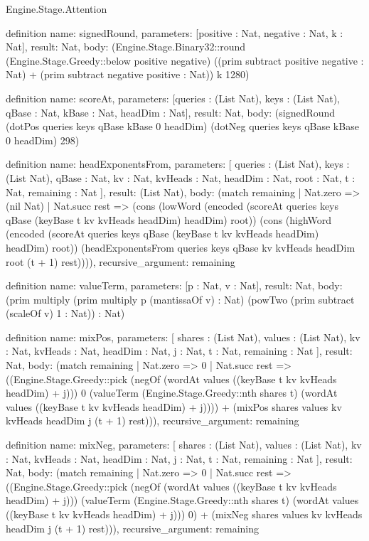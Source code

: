 \begin{lexlean}{Engine.Stage.Attention}
\begin{semanticmodule}
definition{
  name: signedRound,
  parameters: [positive : Nat, negative : Nat, k : Nat],
  result: Nat,
  body: (Engine.Stage.Binary32::round (Engine.Stage.Greedy::below positive negative) ((prim subtract positive negative : Nat) + (prim subtract negative positive : Nat)) k 1280)
}

definition{
  name: scoreAt,
  parameters: [queries : (List Nat), keys : (List Nat), qBase : Nat, kBase : Nat, headDim : Nat],
  result: Nat,
  body: (signedRound (dotPos queries keys qBase kBase 0 headDim) (dotNeg queries keys qBase kBase 0 headDim) 298)
}

definition{
  name: headExponentsFrom,
  parameters: [
    queries : (List Nat),
    keys : (List Nat),
    qBase : Nat,
    kv : Nat,
    kvHeads : Nat,
    headDim : Nat,
    root : Nat,
    t : Nat,
    remaining : Nat
  ],
  result: (List Nat),
  body: (match remaining
    | Nat.zero => (nil Nat)
    | Nat.succ rest => (cons (lowWord (encoded (scoreAt queries keys qBase (keyBase t kv kvHeads headDim) headDim) root)) (cons (highWord (encoded (scoreAt queries keys qBase (keyBase t kv kvHeads headDim) headDim) root)) (headExponentsFrom queries keys qBase kv kvHeads headDim root (t + 1) rest)))),
  recursive_argument: remaining
}

definition{
  name: valueTerm,
  parameters: [p : Nat, v : Nat],
  result: Nat,
  body: (prim multiply (prim multiply p (mantissaOf v) : Nat) (powTwo (prim subtract (scaleOf v) 1 : Nat)) : Nat)
}

definition{
  name: mixPos,
  parameters: [
    shares : (List Nat),
    values : (List Nat),
    kv : Nat,
    kvHeads : Nat,
    headDim : Nat,
    j : Nat,
    t : Nat,
    remaining : Nat
  ],
  result: Nat,
  body: (match remaining
    | Nat.zero => 0
    | Nat.succ rest => ((Engine.Stage.Greedy::pick (negOf (wordAt values ((keyBase t kv kvHeads headDim) + j))) 0 (valueTerm (Engine.Stage.Greedy::nth shares t) (wordAt values ((keyBase t kv kvHeads headDim) + j)))) + (mixPos shares values kv kvHeads headDim j (t + 1) rest))),
  recursive_argument: remaining
}

definition{
  name: mixNeg,
  parameters: [
    shares : (List Nat),
    values : (List Nat),
    kv : Nat,
    kvHeads : Nat,
    headDim : Nat,
    j : Nat,
    t : Nat,
    remaining : Nat
  ],
  result: Nat,
  body: (match remaining
    | Nat.zero => 0
    | Nat.succ rest => ((Engine.Stage.Greedy::pick (negOf (wordAt values ((keyBase t kv kvHeads headDim) + j))) (valueTerm (Engine.Stage.Greedy::nth shares t) (wordAt values ((keyBase t kv kvHeads headDim) + j))) 0) + (mixNeg shares values kv kvHeads headDim j (t + 1) rest))),
  recursive_argument: remaining
}


\end{semanticmodule}
\end{lexlean}
